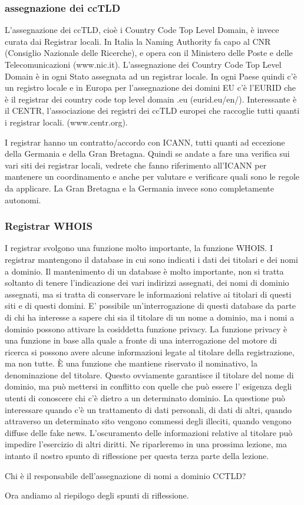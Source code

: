 \subsubsection{assegnazione dei ccTLD} 
 L'assegnazione dei ccTLD, cioè i Country Code Top Level Domain, è invece curata dai Registrar locali. In Italia la Naming Authority fa capo al CNR (Consiglio Nazionale delle Ricerche), e opera con il Ministero delle Poste e delle Telecomunicazioni (www.nic.it). L'assegnazione dei Country Code Top Level Domain è in ogni Stato assegnata ad un registrar locale. In ogni Paese quindi c'è un registro locale e in Europa per l'assegnazione dei domini EU c'è l'EURID che è il registrar dei country code top level domain .eu (eurid.eu/en/). 
 Interessante è il CENTR, l'associazione dei registri dei ccTLD europei che raccoglie tutti quanti i registrar locali. (www.centr.org).\par
 I registrar hanno un contratto/accordo con ICANN, tutti quanti ad eccezione della Germania e della Gran Bretagna. Quindi se andate a fare una verifica sui vari siti dei registrar locali, vedrete che fanno riferimento all'ICANN per mantenere un coordinamento e anche per valutare e verificare quali sono le regole da applicare. La Gran Bretagna e la Germania invece sono completamente autonomi. 
 \subsubsection{Registrar WHOIS}
 I registrar svolgono una funzione molto importante, la funzione WHOIS. I registrar mantengono il database in cui sono indicati i dati dei titolari e dei nomi a dominio. Il mantenimento di un database è molto importante, non si tratta soltanto di tenere l'indicazione dei vari indirizzi assegnati, dei nomi di dominio assegnati, ma si tratta di conservare le informazioni relative ai titolari di questi siti e di questi domini. E' possibile un'interrogazione di questi database da parte di chi ha interesse a sapere chi sia il titolare di un nome a dominio, ma i nomi a dominio possono attivare la cosiddetta funzione privacy. La funzione privacy è una funzione in base alla quale a fronte di una interrogazione del motore di ricerca si possono avere alcune informazioni legate al titolare della registrazione, ma non tutte. È una funzione che mantiene riservato il nominativo, la denominazione del titolare. Questo ovviamente garantisce il titolare del nome di dominio, ma può mettersi in conflitto con quelle che può essere l' esigenza degli utenti di conoscere chi c'è dietro a un determinato dominio. La questione può interessare quando c'è un trattamento di dati personali, di dati di altri, quando attraverso un determinato sito vengono commessi degli illeciti, quando vengono diffuse delle fake news. L'oscuramento delle informazioni relative al titolare può impedire l'esercizio di altri diritti. Ne riparleremo in una prossima lezione, ma intanto il nostro spunto di riflessione per questa terza parte della lezione.\par
 Chi è il responsabile dell'assegnazione di nomi a dominio CCTLD? \par
 Ora andiamo al riepilogo degli spunti di riflessione. 

